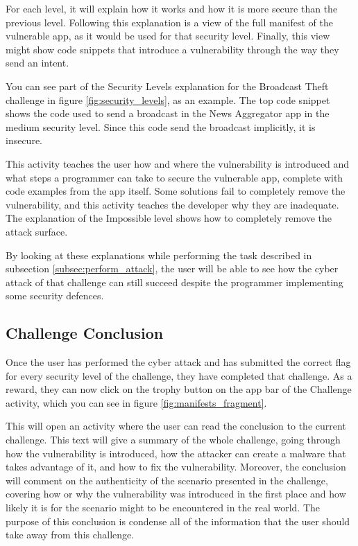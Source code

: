     For each level, it will explain how it works and how it is more secure than the previous level. Following this explanation is a view of the full manifest of the vulnerable app, as it would be used for that security level. Finally, this view might show code snippets that introduce a vulnerability through the way they send an intent.
        
    You can see part of the Security Levels explanation for the Broadcast Theft challenge in figure \ref{fig:security_levels}, as an example. The top code snippet shows the code used to send a broadcast in the News Aggregator app in the medium security level. Since this code send the broadcast implicitly, it is insecure.
    
    This activity teaches the user how and where the vulnerability is introduced and what steps a programmer can take to secure the vulnerable app, complete with code examples from the app itself. Some solutions fail to completely remove the vulnerability, and this activity teaches the developer why they are inadequate. The explanation of the Impossible level shows how to completely remove the attack surface.
    
    By looking at these explanations while performing the task described in subsection \ref{subsec:perform_attack}, the user will be able to see how the cyber attack of that challenge can still succeed despite the programmer implementing some security defences.
    
    \subsection{Challenge Conclusion}
        \label{subsec:challenge_conclusion}
    
    Once the user has performed the cyber attack and has submitted the correct flag for every security level of the challenge, they have completed that challenge. As a reward, they can now click on the trophy button on the app bar of the Challenge activity, which you can see in figure \ref{fig:manifests_fragment}.
    
    This will open an activity where the user can read the conclusion to the current challenge. This text will give a summary of the whole challenge, going through how the vulnerability is introduced, how the attacker can create a malware that takes advantage of it, and how to fix the vulnerability. Moreover, the conclusion will comment on the authenticity of the scenario presented in the challenge, covering how or why the vulnerability was introduced in the first place and how likely it is for the scenario might to be encountered in the real world. The purpose of this conclusion is condense all of the information that the user should take away from this challenge.
    
